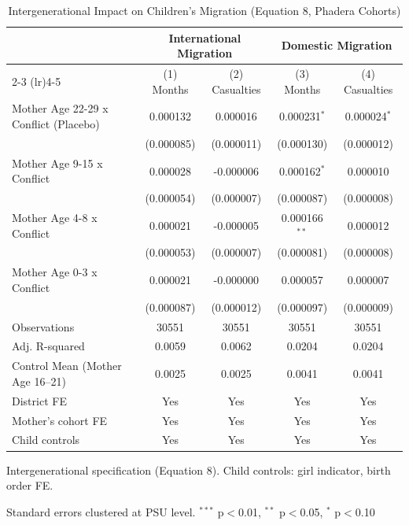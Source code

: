 \begin{table}[htbp]
\centering
\footnotesize
\caption{Intergenerational Impact on Children's Migration (Equation 8, Phadera Cohorts)}
\label{tab:eq8_phadera}
\begin{tabular}{l cccc}
\toprule
 & \multicolumn{2}{c}{International Migration} & \multicolumn{2}{c}{Domestic Migration} \\
\cmidrule(lr){2-3} \cmidrule(lr){4-5}
 & (1) Months & (2) Casualties & (3) Months & (4) Casualties \\
\midrule
\quad Mother Age 22-29 x Conflict (Placebo) & 0.000132 & 0.000016 & 0.000231$^{*}$ & 0.000024$^{*}$ \\
 & (0.000085) & (0.000011) & (0.000130) & (0.000012) \\
\quad Mother Age 9-15 x Conflict & 0.000028 & -0.000006 & 0.000162$^{*}$ & 0.000010 \\
 & (0.000054) & (0.000007) & (0.000087) & (0.000008) \\
\quad Mother Age 4-8 x Conflict & 0.000021 & -0.000005 & 0.000166$^{**}$ & 0.000012 \\
 & (0.000053) & (0.000007) & (0.000081) & (0.000008) \\
\quad Mother Age 0-3 x Conflict & 0.000021 & -0.000000 & 0.000057 & 0.000007 \\
 & (0.000087) & (0.000012) & (0.000097) & (0.000009) \\
\midrule
Observations & 30551 & 30551 & 30551 & 30551 \\
Adj. R-squared & 0.0059 & 0.0062 & 0.0204 & 0.0204 \\
Control Mean (Mother Age 16--21) & 0.0025 & 0.0025 & 0.0041 & 0.0041 \\
District FE & Yes & Yes & Yes & Yes \\
Mother's cohort FE & Yes & Yes & Yes & Yes \\
Child controls & Yes & Yes & Yes & Yes \\
\bottomrule
\end{tabular}
\begin{tablenotes}
\footnotesize
\item Intergenerational specification (Equation 8). Child controls: girl indicator, birth order FE.
\item Standard errors clustered at PSU level. $^{***}$ p$<$0.01, $^{**}$ p$<$0.05, $^{*}$ p$<$0.10
\end{tablenotes}
\end{table}

\clearpage

